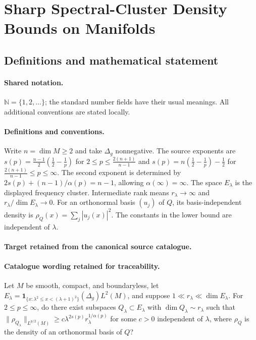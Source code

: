 \documentclass[11pt]{article}
\begin{document}
\section{Sharp Spectral-Cluster Density Bounds on Manifolds}\label{statement}

\subsection{Definitions and mathematical statement}

\paragraph{Shared notation.}$\mathbb N=\{1,2,\ldots\}$; the standard number fields have their usual meanings. All additional conventions are stated locally.


\paragraph{Definitions and conventions.}
Write $n=\dim M\geq2$ and take $\Delta_g$ nonnegative. The source exponents are $s(p)=\frac{n-1}{2}(\frac12-\frac1p)$ for $2\leq p\leq\frac{2(n+1)}{n-1}$ and $s(p)=n(\frac12-\frac1p)-\frac12$ for $\frac{2(n+1)}{n-1}\leq p\leq\infty$. The second exponent is determined by $2s(p)+(n-1)/\alpha(p)=n-1$, allowing $\alpha(\infty)=\infty$. The space $E_\lambda$ is the displayed frequency cluster. Intermediate rank means $r_\lambda\to\infty$ and $r_\lambda/\dim E_\lambda\to0$. For an orthonormal basis $(u_j)$ of $Q$, its basis-independent density is $\rho_Q(x)=\sum_j|u_j(x)|^2$. The constants in the lower bound are independent of $\lambda$.

\paragraph{Target retained from the canonical source catalogue.}
\paragraph{Catalogue wording retained for traceability.}
Let $M$ be smooth, compact, and boundaryless, let $E_\lambda=\mathbf{1}_{\{x:\lambda^2\leq x<(\lambda+1)^2\}}(\Delta_g)L^2(M)$, and suppose $1\ll r_\lambda\ll\dim E_\lambda$. For $2\leq p\leq\infty$, do there exist subspaces $Q_\lambda\subset E_\lambda$ with $\dim Q_\lambda\sim r_\lambda$ such that $\lVert\rho_{Q_\lambda}\rVert_{L^{p/2}(M)}\geq c\lambda^{2s(p)}r_\lambda^{1/\alpha(p)}$ for some $c>0$ independent of $\lambda$, where $\rho_Q$ is the density of an orthonormal basis of $Q$?
\end{document}
